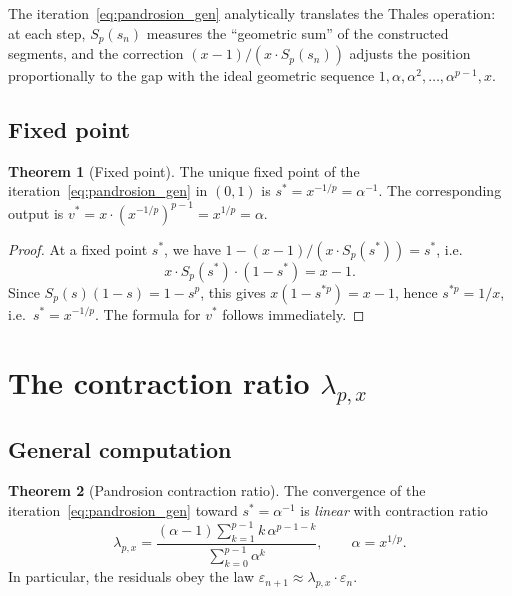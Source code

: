 \documentclass[11pt,a4paper]{article}
\theoremstyle{definition}
\newtheorem{theorem}{Theorem}[section]
\newcommand{\eps}{\varepsilon}
\begin{document}
The iteration~\eqref{eq:pandrosion_gen} analytically translates the Thales operation: at each step, $S_p(s_n)$ measures the ``geometric sum'' of the constructed segments, and the correction $(x-1)/(x \cdot S_p(s_n))$ adjusts the position proportionally to the gap with the ideal geometric sequence $1, \alpha, \alpha^2, \ldots, \alpha^{p-1}, x$.

\subsection{Fixed point}

\begin{theorem}[Fixed point]
\label{thm:fixed_point}
The unique fixed point of the iteration~\eqref{eq:pandrosion_gen} in $(0,1)$ is $s^* = x^{-1/p} = \alpha^{-1}$. The corresponding output is $v^* = x \cdot (x^{-1/p})^{p-1} = x^{1/p} = \alpha$.
\end{theorem}

\begin{proof}
At a fixed point $s^*$, we have $1 - (x-1)/(x \cdot S_p(s^*)) = s^*$, i.e.\
\[
  x \cdot S_p(s^*) \cdot (1 - s^*) = x - 1.
\]
Since $S_p(s)(1-s) = 1 - s^p$, this gives $x(1 - s^{*p}) = x - 1$, hence $s^{*p} = 1/x$, i.e.\ $s^* = x^{-1/p}$. The formula for $v^*$ follows immediately.
\end{proof}

\section{The contraction ratio \texorpdfstring{$\lambda_{p,x}$}{lambda}}
\label{sec:coefficient}

\subsection{General computation}

\begin{theorem}[Pandrosion contraction ratio]
\label{thm:lambda}
The convergence of the iteration~\eqref{eq:pandrosion_gen} toward $s^* = \alpha^{-1}$ is \emph{linear} with contraction ratio
\begin{equation}
  \label{eq:lambda_general}
  \boxed{
  \lambda_{p,x} = \frac{(\alpha - 1)\displaystyle\sum_{k=1}^{p-1} k\,\alpha^{p-1-k}}{\displaystyle\sum_{k=0}^{p-1} \alpha^k}
  }, \qquad \alpha = x^{1/p}.
\end{equation}
In particular, the residuals obey the law $\eps_{n+1} \approx \lambda_{p,x} \cdot \eps_n$.
\end{theorem}
\end{document}

